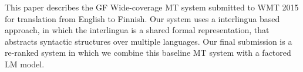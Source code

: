 This paper describes the GF Wide-coverage MT system submitted to WMT 2015 for translation from English to Finnish. Our system uses a interlingua based approach, in which the interlingua is a shared formal representation, that abstracts syntactic structures over multiple languages. Our final submission is a re-ranked system in which we combine this baseline MT system with a factored LM model.
